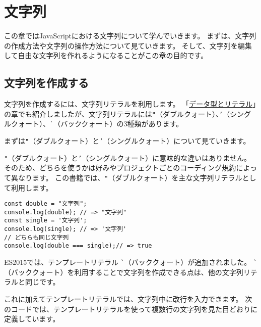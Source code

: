 \hypertarget{string}{%
\chapter{文字列}\label{string}}
\thispagestyle{frontheadings}

この章ではJavaScriptにおける文字列について学んでいきます。
まずは、文字列の作成方法や文字列の操作方法について見ていきます。
そして、文字列を編集して自由な文字列を作れるようになることがこの章の目的です。

\hypertarget{create}{%
\section{文字列を作成する}\label{create}}

文字列を作成するには、文字列リテラルを利用します。
「\hyperlink{data-type-and-literal}{データ型とリテラル}」の章でも紹介しましたが、文字列リテラルには\texttt{"}（ダブルクォート）、\texttt{'}（シングルクォート）、\lstinline{`}（バッククォート）の3種類があります。

まずは\texttt{"}（ダブルクォート）と\texttt{'}（シングルクォート）について見ていきます。

\texttt{"}（ダブルクォート）と\texttt{'}（シングルクォート）に意味的な違いはありません。
そのため、どちらを使うかは好みやプロジェクトごとのコーディング規約によって異なります。
この書籍では、\texttt{"}（ダブルクォート）を主な文字列リテラルとして利用します。

\begin{lstlisting}
const double = "文字列";
console.log(double); // => "文字列"
const single = '文字列';
console.log(single); // => '文字列'
// どちらも同じ文字列
console.log(double === single);// => true
\end{lstlisting}

ES2015では、テンプレートリテラル
\lstinline{`}（バッククォート）が追加されました。
\lstinline{`}（バッククォート）を利用することで文字列を作成できる点は、他の文字列リテラルと同じです。

これに加えてテンプレートリテラルでは、文字列中に改行を入力できます。
次のコードでは、テンプレートリテラルを使って複数行の文字列を見た目どおりに定義しています。

